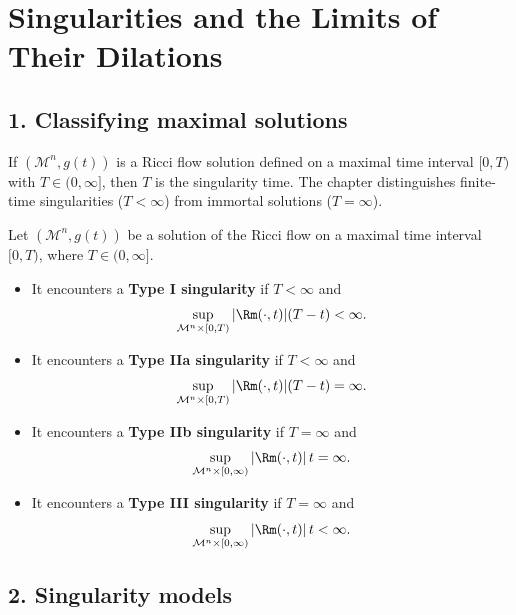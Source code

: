 \chapter{Singularities and the Limits of Their Dilations}

\section*{1. Classifying maximal solutions}

\begin{remark}
\label{ch08-rem-singularity-time-maximal-solutions}
If \((\mathcal M^n,g(t))\) is a Ricci flow solution defined on a maximal time interval \([0,T)\) with \(T\in(0,\infty]\), then \(T\) is the singularity time. The chapter distinguishes finite-time singularities (\(T<\infty\)) from immortal solutions (\(T=\infty\)).
\end{remark}

\begin{definition}
\label{ch08-def-singularity-types}
Let \((\mathcal M^n,g(t))\) be a solution of the Ricci flow on a maximal time interval \( [0,T)\), where \(T\in(0,\infty]\).
\begin{itemize}
\item It encounters a \textbf{Type I singularity} if \(T<\infty\) and
\[
\sup_{\mathcal M^n\times[0,T)} |\Rm(\cdot,t)|(T-t)<\infty.
\]
\item It encounters a \textbf{Type IIa singularity} if \(T<\infty\) and
\[
\sup_{\mathcal M^n\times[0,T)} |\Rm(\cdot,t)|(T-t)=\infty.
\]
\item It encounters a \textbf{Type IIb singularity} if \(T=\infty\) and
\[
\sup_{\mathcal M^n\times[0,\infty)} |\Rm(\cdot,t)|\,t=\infty.
\]
\item It encounters a \textbf{Type III singularity} if \(T=\infty\) and
\[
\sup_{\mathcal M^n\times[0,\infty)} |\Rm(\cdot,t)|\,t<\infty.
\]
\end{itemize}
\end{definition}

\section*{2. Singularity models}

